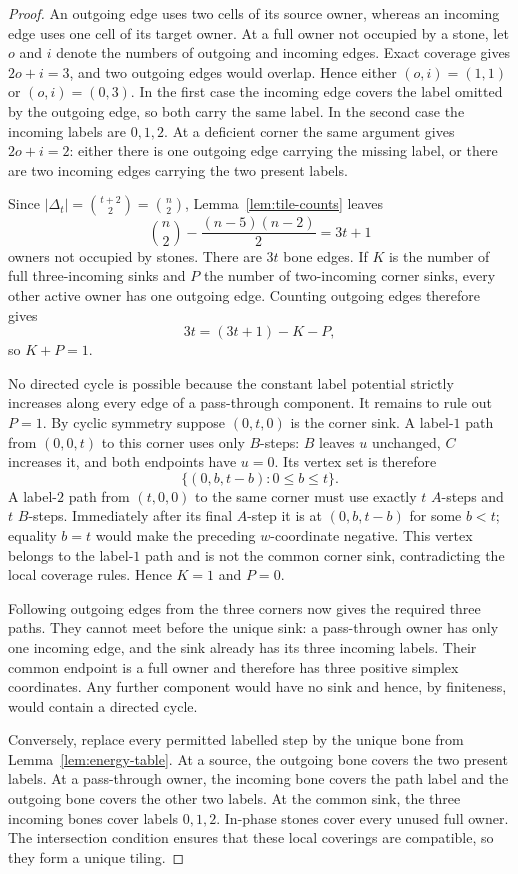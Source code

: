 \documentclass[11pt]{amsart}
\theoremstyle{definition}
\begin{document}
\begin{proof}
An outgoing edge uses two cells of its source owner, whereas an incoming edge
uses one cell of its target owner.  At a full owner not occupied by a stone,
let $o$ and $i$ denote the numbers of outgoing and incoming edges.  Exact
coverage gives $2o+i=3$, and two outgoing edges would overlap.  Hence either
$(o,i)=(1,1)$ or $(o,i)=(0,3)$.  In the first case the incoming edge covers
the label omitted by the outgoing edge, so both carry the same label.  In the
second case the incoming labels are $0,1,2$.  At a deficient corner the same
argument gives $2o+i=2$: either there is one outgoing edge carrying the
missing label, or there are two incoming edges carrying the two present
labels.

Since $|\Delta_t|=\binom{t+2}{2}=\binom n2$, Lemma~\ref{lem:tile-counts}
leaves
\[
 \binom n2-\frac{(n-5)(n-2)}2=3t+1
\]
owners not occupied by stones.  There are $3t$ bone edges.  If $K$ is the
number of full three-incoming sinks and $P$ the number of two-incoming corner
sinks, every other active owner has one outgoing edge.  Counting outgoing
edges therefore gives
\[
 3t=(3t+1)-K-P,
\]
so $K+P=1$.

No directed cycle is possible because the constant label potential strictly
increases along every edge of a pass-through component.  It remains to rule
out $P=1$.  By cyclic symmetry suppose $(0,t,0)$ is the corner sink.  A
label-$1$ path from $(0,0,t)$ to this corner uses only $B$-steps: $B$ leaves
$u$ unchanged, $C$ increases it, and both endpoints have $u=0$.  Its vertex
set is therefore
\[
 \{(0,b,t-b):0\leq b\leq t\}.
\]
A label-$2$ path from $(t,0,0)$ to the same corner must use exactly $t$
$A$-steps and $t$ $B$-steps.  Immediately after its final $A$-step it is at
$(0,b,t-b)$ for some $b<t$; equality $b=t$ would make the preceding
$w$-coordinate negative.  This vertex belongs to the label-$1$ path and is
not the common corner sink, contradicting the local coverage rules.  Hence
$K=1$ and $P=0$.

Following outgoing edges from the three corners now gives the required three
paths.  They cannot meet before the unique sink: a pass-through owner has only
one incoming edge, and the sink already has its three incoming labels.  Their
common endpoint is a full owner and therefore has three positive simplex
coordinates.  Any further component would have no sink and hence, by
finiteness, would contain a directed cycle.

Conversely, replace every permitted labelled step by the unique bone from
Lemma~\ref{lem:energy-table}.  At a source, the outgoing bone covers the two
present labels.  At a pass-through owner, the incoming bone covers the path
label and the outgoing bone covers the other two labels.  At the common sink,
the three incoming bones cover labels $0,1,2$.  In-phase stones cover every
unused full owner.  The intersection condition ensures that these local
coverings are compatible, so they form a unique tiling.
\end{proof}
\end{document}
